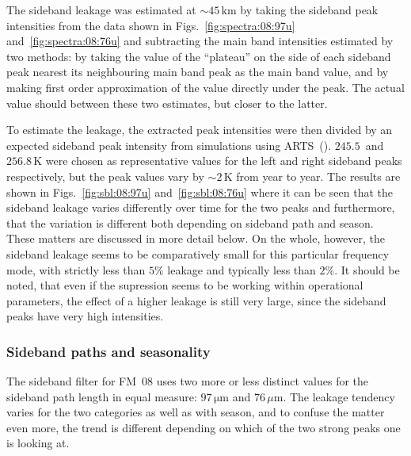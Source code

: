 \noindent
The sideband leakage was estimated at $\sim45\,\mathrm{km}$ by taking the
sideband peak intensities from the data shown in Figs.~\ref{fig:spectra:08:97u}
and~\ref{fig:spectra:08:76u} and subtracting the main band intensities
estimated by two methods:  by taking the value of the ``plateau'' on the side
of each sideband peak nearest its neighbouring main band peak as the main band
value, and by making first order approximation of the value directly under the
peak.  The actual value should between these two estimates, but closer to the
latter.

To estimate the leakage, the extracted peak intensities were then divided by an
expected sideband peak intensity from simulations using
ARTS~(\cite{buehler:artst:05}).  $245.5$~and $256.8\,\mathrm{K}$ were chosen as
representative values for the left and right sideband peaks respectively, but
the peak values vary by $\sim2\,\mathrm{K}$ from year to year.  The results are
shown in Figs.~\ref{fig:sbl:08:97u} and~\ref{fig:sbl:08:76u} where it can be
seen that the sideband leakage varies differently over time for the two peaks
and furthermore, that the variation is different both depending on sideband
path and season.  These matters are discussed in more detail below.  On the
whole, however, the sideband leakage seems to be comparatively small for this
particular frequency mode, with strictly less than $5\%$ leakage and typically
less than $2\%$.  It should be noted, that even if the supression seems to be
working within operational parameters, the effect of a higher leakage is still
very large, since the sideband peaks have very high intensities.


\subsubsection{Sideband paths and seasonality}
\label{FM08:sbpath}
\label{FM08:seasonality}
The sideband filter for FM~08 uses two more or less distinct values for the
sideband path length in equal measure: $97\,\mathrm{\mu m}$ and
$76\,\mu\mathrm{m}$.  The leakage tendency varies for the two categories as
well as with season, and to confuse the matter even more, the trend is
different depending on which of the two strong peaks one is looking at.

